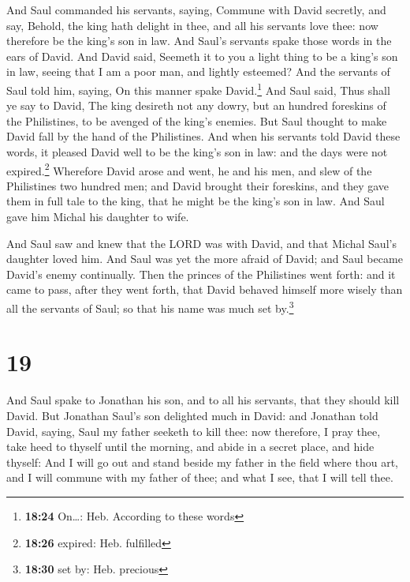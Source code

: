  And Saul commanded his servants, saying, Commune with
David secretly, and say, Behold, the king hath delight in thee, and all
his servants love thee: now therefore be the king's son in law.
 And Saul's servants spake those words in the ears of
David. And David said, Seemeth it to you a light thing to be a king's
son in law, seeing that I am a poor man, and lightly esteemed?
 And the servants of Saul told him, saying, On this
manner spake David.\footnote{\textbf{18:24} On\ldots: Heb. According to
  these words}  And Saul said, Thus shall ye say to
David, The king desireth not any dowry, but an hundred foreskins of the
Philistines, to be avenged of the king's enemies. But Saul thought to
make David fall by the hand of the Philistines.  And when
his servants told David these words, it pleased David well to be the
king's son in law: and the days were not expired.\footnote{\textbf{18:26}
  expired: Heb. fulfilled}  Wherefore David arose and
went, he and his men, and slew of the Philistines two hundred men; and
David brought their foreskins, and they gave them in full tale to the
king, that he might be the king's son in law. And Saul gave him Michal
his daughter to wife.

 And Saul saw and knew that the LORD was with David, and
that Michal Saul's daughter loved him.  And Saul was yet
the more afraid of David; and Saul became David's enemy continually.
 Then the princes of the Philistines went forth: and it
came to pass, after they went forth, that David behaved himself more
wisely than all the servants of Saul; so that his name was much set
by.\footnote{\textbf{18:30} set by: Heb. precious}

\hypertarget{section-18}{%
\section{19}\label{section-18}}

 And Saul spake to Jonathan his son, and to all his
servants, that they should kill David.  But Jonathan
Saul's son delighted much in David: and Jonathan told David, saying,
Saul my father seeketh to kill thee: now therefore, I pray thee, take
heed to thyself until the morning, and abide in a secret place, and hide
thyself:  And I will go out and stand beside my father in
the field where thou art, and I will commune with my father of thee; and
what I see, that I will tell thee.

